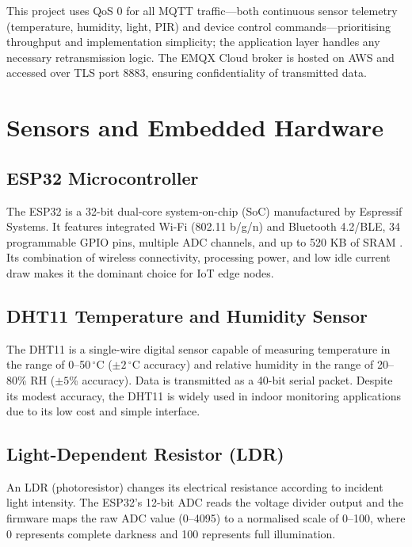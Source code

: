 This project uses QoS 0 for all MQTT traffic---both continuous sensor telemetry (temperature, humidity, light, PIR) and device control commands---prioritising throughput and implementation simplicity; the application layer handles any necessary retransmission logic. The EMQX Cloud broker is hosted on AWS and accessed over TLS port 8883, ensuring confidentiality of transmitted data.

\section{Sensors and Embedded Hardware}

\subsection{ESP32 Microcontroller}

The ESP32 is a 32-bit dual-core system-on-chip (SoC) manufactured by Espressif Systems. It features integrated Wi-Fi (802.11 b/g/n) and Bluetooth 4.2/BLE, 34 programmable GPIO pins, multiple ADC channels, and up to 520 KB of SRAM \cite{Espressif2023}. Its combination of wireless connectivity, processing power, and low idle current draw makes it the dominant choice for IoT edge nodes.

\subsection{DHT11 Temperature and Humidity Sensor}

The DHT11 is a single-wire digital sensor capable of measuring temperature in the range of 0--50\,$^\circ$C ($\pm2\,^\circ$C accuracy) and relative humidity in the range of 20--80\% RH ($\pm5$\% accuracy). Data is transmitted as a 40-bit serial packet. Despite its modest accuracy, the DHT11 is widely used in indoor monitoring applications due to its low cost and simple interface.

\subsection{Light-Dependent Resistor (LDR)}

An LDR (photoresistor) changes its electrical resistance according to incident light intensity. The ESP32's 12-bit ADC reads the voltage divider output and the firmware maps the raw ADC value (0--4095) to a normalised scale of 0--100, where 0 represents complete darkness and 100 represents full illumination.

